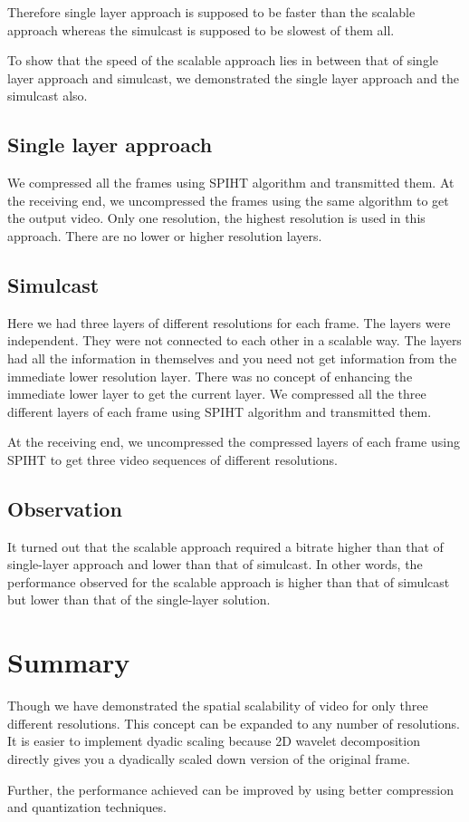 \documentclass[10pt,twocolumn]{article}
\begin{document}
Therefore single layer approach is supposed to be faster than the scalable approach whereas the simulcast is supposed to be slowest of them all\cite{segall2007}.

To show that the speed of the scalable approach lies in between that of single layer approach and simulcast, we demonstrated the single layer approach and the simulcast also.

\subsection*{Single layer approach}
We compressed all the frames using SPIHT algorithm and transmitted them. At the receiving end, we uncompressed the frames using the same algorithm to get the output video. Only one resolution, the highest resolution is used in this approach. There are no lower or higher resolution layers.

\subsection*{Simulcast}

Here we had three layers of different resolutions for each frame. The layers were independent. They were not connected to each other in a scalable way. The layers had all the information in themselves and you need not get information from the immediate lower resolution layer. There was no concept of enhancing the immediate lower layer to get the current layer. We compressed all the three different layers of each frame using SPIHT algorithm and transmitted them.

At the receiving end, we uncompressed the compressed layers of each frame using SPIHT to get three video sequences of different resolutions.

\subsection*{Observation}
It turned out that the scalable approach required a bitrate higher than that of single-layer approach and lower than that of simulcast. In other words, the performance observed for the scalable approach is higher than that of simulcast but lower than that of the single-layer solution.

\section{Summary}

Though we have demonstrated the spatial scalability of video for only three different resolutions. This concept can be expanded to any number of resolutions. It is easier to implement dyadic scaling because 2D wavelet decomposition directly gives you a dyadically scaled down version of the original frame.

Further, the performance achieved can be improved by using better compression and quantization techniques.



\end{document}
